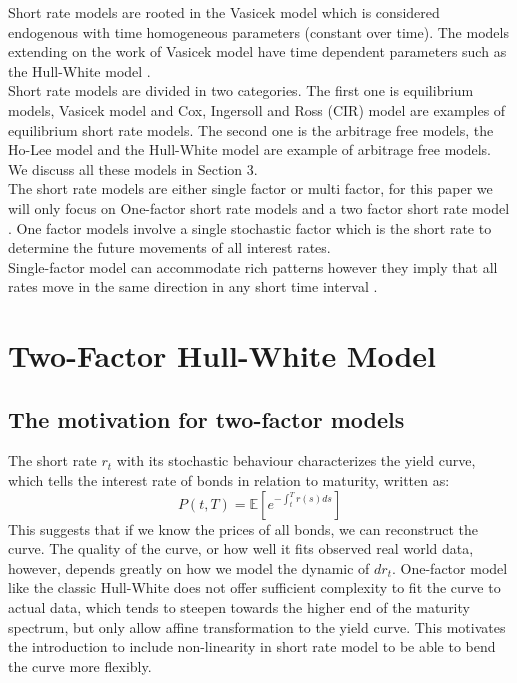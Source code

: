 \documentclass{article}
\begin{document}
Short rate models are rooted in the Vasicek model \cite{BN1} which is considered endogenous with time homogeneous parameters (constant over time).  The models extending on the work of Vasicek model have time dependent parameters such as the Hull-White model \cite{HW1}. \\

Short rate models are divided in two categories.  The first one is equilibrium models, Vasicek model and Cox, Ingersoll and Ross (CIR) model are examples of equilibrium short rate models.  The second one is the arbitrage free models, the Ho-Lee model and the Hull-White model are example of arbitrage free models.  We discuss all these models in Section 3. \\ 

The short rate models are either single factor or multi factor, for this paper we will only focus on One-factor short rate models and a two factor short rate model \cite{BA1}.  One factor  models involve a single stochastic factor which is the short rate to determine the future movements of all interest rates.  \\

Single-factor model can accommodate rich patterns however they imply that all rates move in the same direction in any short time interval \cite{cheng2006hull}.


\section{Two-Factor Hull-White Model 
}
\subsection{The motivation for two-factor models
}
The short rate $r_t$ with its stochastic behaviour characterizes the yield curve, which tells the interest rate of bonds in relation to maturity, written as:
\[
P(t,T) = \mathbb{E}\left[e^{-\int_{t}^{T}r(s)ds}\right]
\]
This suggests that if we know the prices of all bonds, we can reconstruct the curve. The quality of the curve, or how well it fits observed real world data, however, depends greatly on how we model the dynamic of $dr_t$. One-factor model like the classic Hull-White does not offer sufficient complexity to fit the curve to actual data, which tends to steepen towards the higher end of the maturity spectrum, but only allow affine transformation to the yield curve. This motivates the introduction to include non-linearity in short rate model to be able to bend the curve more flexibly.
\end{document}
